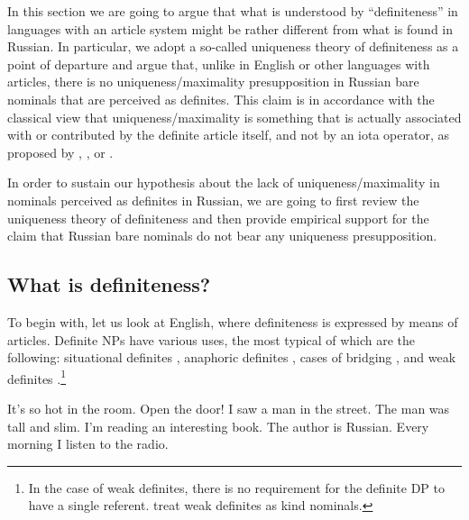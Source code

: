 \documentclass[output=paper,
colorlinks,
citecolor=brown,
newtxmath
]{langscibook}
\begin{document}
In this section we are going to argue that what is understood by ``definiteness'' in languages with an article system might be rather different from what is found in Russian. In particular, we adopt a so-called uniqueness theory of definiteness as a point of departure and argue that,  %
unlike in English or other languages with articles, there is no uniqueness/maximality presupposition in Russian bare nominals that are perceived as definites. %
This claim is in accordance with the classical view \citep{Partee1987} that uniqueness/maximality is something that is actually associated with or contributed by the definite article itself, and not by an iota operator, as proposed by \citet{Chierchia1998}, \citet{Dayal2004}, or \citet{Coppock.Beaver2015}.

In order to sustain our hypothesis about the lack of uniqueness/maximality in nominals perceived as definites in Russian, we are going to first review the uniqueness theory of
definiteness and then provide empirical support for the claim that Russian bare nominals do not bear any uniqueness presupposition.

\subsection{What is definiteness?}
To begin with, let us look at English, where definiteness is expressed by means of articles.
Definite NPs have various uses, the most typical of which are the following: situational definites , anaphoric definites , cases of bridging \citep{Clark1975} , and weak definites .\footnote{In the case of weak definites, there is no requirement for the definite DP to have a single referent.
\citet{Aguilar-Guevara.Zwarts2010} treat weak definites as kind nominals.}

\ea \label{ex:16}
It's so hot in the room. Open the door!
\z
\ea \label{ex:17}
I saw a man in the street. The man was tall and slim.
\z
\ea \label{ex:18}
	I'm reading an interesting book. The author is Russian.
\z
\ea \label{ex:19}
Every morning I listen to the radio.
\z
\end{document}
